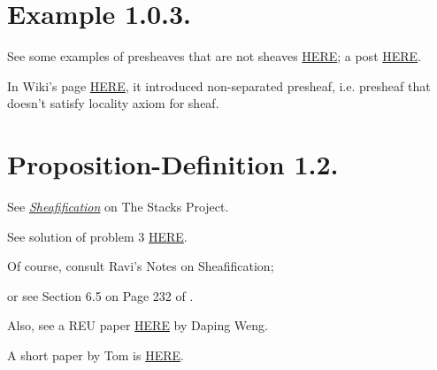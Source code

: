 \section{Example 1.0.3.}

See some examples of presheaves that are not sheaves \href{https://en.wikipedia.org/wiki/Sheaf_(mathematics)}{HERE}; a post \href{https://math.stackexchange.com/questions/195363/constant-presheaf-not-necessarily-a-sheaf-proof}{HERE}.

In Wiki's page \href{https://en.wikipedia.org/wiki/Sheaf_(mathematics)}{HERE}, it introduced non-separated presheaf, i.e. presheaf that doesn't satisfy locality axiom for sheaf.

\section{Proposition-Definition 1.2.}

See \href{https://stacks.math.columbia.edu/tag/007X}{\textit{Sheafification}} on The Stacks Project.

See solution of problem 3 \href{https://www2.math.ethz.ch/education/bachelor/lectures/fs2016/math/alg_geom/Solution11.pdf}{HERE}.

Of course, consult Ravi's Notes on Sheafification; 

or see Section 6.5 on Page 232 of \cite{bosch2013algebraic}.

Also, see a REU paper \href{http://www.math.uchicago.edu/%7Emay/VIGRE/VIGRE2011/REUPapers/WengD.pdf}{HERE} by Daping Weng.

A short paper by Tom is \href{https://www.maths.ed.ac.uk/~tl/sheaves.pdf}{HERE}. 